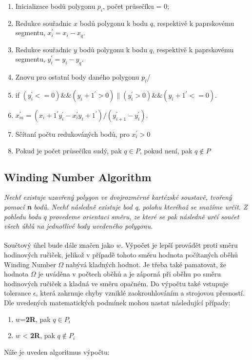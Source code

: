 \documentclass{article}
\begin{document}
\begin{enumerate} 

\item Inicializace bodů polygonu $p_i$, počet průsečíku = 0;

\item Redukce souřadnic $x$ bodů polygonu k bodu $q$,  respektivě k paprskovému segmentu, $x_i^{'} = x_i - x_q$. 

\item  Redukce souřadnic $y$ bodů polygonu k bodu $q$, respektivě k paprskovému segmentu, $y_i^{'} = y_i - y_q$. 

\item Znovu pro ostatní body daného polygonu $p_i$/ 

\item if $(y_{i}^{'} <= 0)\&\&(y_i+1^{'} > 0)\|(y_{i}^{'} > 0)\&\&(y_i+1^{'} <= 0)$. 

\item $x_m^{'} = (x_i+1^{'}y_{i}^{'}-x_{i}^{'}y_i+1^{'})/(y_{i+1}^{'}-y_{i}^{'})$. 

\item Sčítaní počtu redukováných bodů, pro $x_i^{'} > 0$  


\item Pokud je počet průsečíku sudý, pak $q \in P$, pokud není, pak  $q \notin P$ 

\end{enumerate} 
\clearpage
\newpage 

\subsection{Winding Number Algorithm} 
\textsl{Nechť existuje uzavřený polygon ve dvojrozměrné kartézské soustavě, tvořený pomocí \textbf n bodů. Nechť následně existuje bod q, polohu kteréhož se snažíme určit. Z pohledu bodu $q$ provedeme orientaci směru, ze které se pak následně určí součet všech úhlů na jednotlivé body uvedeného polygonu.}
\\
\\
Součtový úhel bude dále značen jako $w$. Výpočet je lepší provádět proti směru hodinových ručiček, jelikož v případě tohoto směru hodnota počítaných oběhů Winding Number $\Omega$  nabývá kladných hodnot. Je třeba také pamatovat, že hodnota $\Omega$ je uváděna v počtech oběhů a je záporná při oběhu po směru 
hodinových ručiček a kladná ve směru opačném. Do výpočtu také vstupuje tolerance $\epsilon$, která zahrnuje chyby vzniklé zaokrouhlováním a strojovou přesností. Dle uvedených matematických podmínek mohou nastat následující případy:
\begin{enumerate} 
\item $w$=\textbf {2R}, pak $q \in P_i$ 
\item  $w$ < \textbf {2R}, pak $q {\not \in} P_i$
\end{enumerate}
 Níže je uveden algoritmus výpočtu: 
\end{document}
